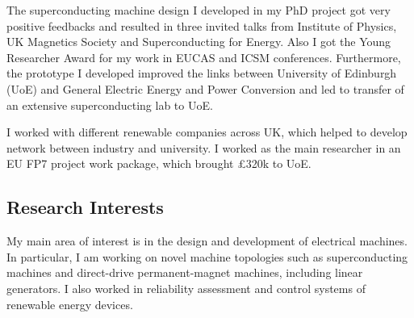 \documentclass[a4paper,12pt]{article}
\begin{document}
The superconducting machine design I developed in my PhD project got very positive feedbacks and resulted in three invited talks from Institute of Physics, UK Magnetics Society and Superconducting for Energy. Also I got the Young Researcher Award for my work in EUCAS and ICSM conferences. Furthermore, the prototype I developed improved the links between University of Edinburgh (UoE) and General Electric Energy and Power Conversion and led to transfer of an extensive superconducting lab to UoE. 

I worked with different renewable companies across UK, which helped to develop network between industry and university. I worked as the main researcher in an EU FP7 project work package, which brought £320k to UoE. 


\clearpage
\subsection{Research Interests}

My main area of interest is in the design and development of electrical machines. In particular, I am working on novel machine topologies such as superconducting machines and direct-drive permanent-magnet machines, including linear generators. I also worked in reliability assessment and control systems of renewable energy devices.
\end{document}
